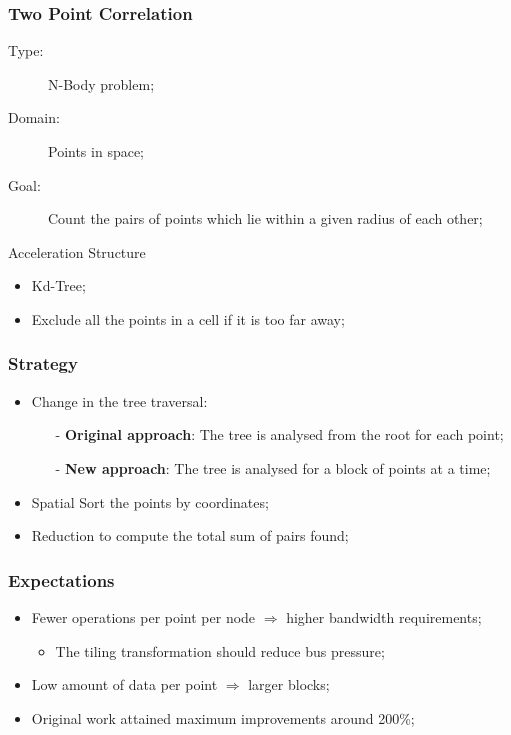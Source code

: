 \begin{frame}
	\frametitle{Two Point Correlation}
	\vfill
	\begin{description}
		\item[Type:] N-Body problem;
		\item[Domain:] Points in space;
		\item[Goal:] Count the pairs of points which lie within a given radius of each other;
	\end{description}
	\vfill
	\begin{block}{Acceleration Structure}
		\begin{itemize}
			\item Kd-Tree;
			\item Exclude all the points in a cell if it is too far away;
		\end{itemize}
	\end{block}
	\vfill
\end{frame}

\begin{frame}
	\frametitle{Strategy}
	\begin{itemize}\itemsep=20pt
		\item Change in the tree traversal:
		\begin{itemize}
			\item[-] \textbf{Original approach}: The tree is analysed from the root for each point;
			\item[-] \textbf{New approach}: The tree is analysed for a block of points at a time;
		\end{itemize}
		\item Spatial Sort the points by coordinates;
		\item Reduction to compute the total sum of pairs found;
	\end{itemize}
\end{frame}

\begin{frame}
	\frametitle{Expectations}
	\begin{itemize}\itemsep=20pt
		\item Fewer operations per point per node $\Rightarrow$ higher bandwidth requirements;
		\begin{itemize}
			\item The tiling transformation should reduce bus pressure;
		\end{itemize}
		\item Low amount of data per point $\Rightarrow$ larger blocks;
		\item Original work attained maximum improvements around 200\%;
	\end{itemize}
\end{frame}
